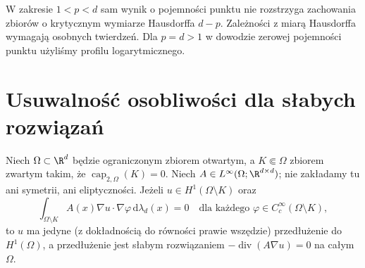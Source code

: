 \begin{uwaga}
W zakresie $1<p<d$ sam wynik o pojemności punktu
nie rozstrzyga zachowania zbiorów o krytycznym wymiarze
Hausdorffa $d-p$. Zależności z miarą Hausdorffa wymagają
osobnych twierdzeń. Dla $p=d>1$ w dowodzie zerowej
pojemności punktu użyliśmy profilu logarytmicznego.
\end{uwaga}

\section{Usuwalność osobliwości dla słabych rozwiązań}
\label{sec:pde19-removable}
\begin{twierdzenie}
\label{thm:pde19-remove}
Niech $\Omega\subset\R^d$ będzie ograniczonym zbiorem otwartym,
a $K\Subset\Omega$ zbiorem zwartym takim, że
$\operatorname{cap}_{2,\Omega}(K)=0$.
Niech $A\in L^\infty(\Omega;\R^{d\times d})$;
nie zakładamy tu ani symetrii, ani eliptyczności.
Jeżeli $u\in H^1(\Omega\setminus K)$ oraz
\begin{equation}\label{eq:pde19-off-K}
 \int_{\Omega\setminus K}A(x)\nabla u\cdot\nabla\varphi
 \,\mathrm d\lambda_d(x)=0
 \quad\text{dla każdego }\varphi\in C_c^\infty(\Omega\setminus K),
\end{equation}
to $u$ ma jedyne (z dokładnością do równości prawie
wszędzie) przedłużenie do $H^1(\Omega)$, a przedłużenie
jest słabym rozwiązaniem $-\operatorname{div}(A\nabla u)=0$
na całym $\Omega$.
\end{twierdzenie}
